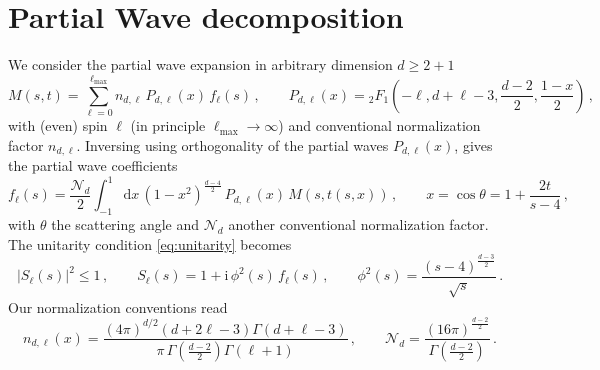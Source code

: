 \section*{Partial Wave decomposition}
We consider the partial wave expansion in arbitrary dimension $d\geq 2+1$
\begin{equation}
M(s,t)=\sum_{\ell=0}^{\ell_\mathrm{max}}n_{d,\ell}\,P_{d,\ell}(x)\,f_\ell(s)\,,
\qquad
P_{d,\ell}(x)={}_2F_1\left(-\ell,d+\ell-3,\frac{d-2}{2},\frac{1-x}{2}\right)\,,
\end{equation}
with (even) spin $\ell$ (in principle $\ell_\mathrm{max}\rightarrow\infty$) and conventional normalization factor $n_{d,\ell}$. Inversing using orthogonality of the partial waves $P_{d,\ell}(x)$, gives the partial wave coefficients
\begin{equation}
f_\ell(s)=\frac{\mathcal{N}_d}{2}\int_{-1}^{1}\mathrm{d}x\,(1-x^2)^{\frac{d-4}{2}}\,P_{d,\ell}(x)\,M(s,t(s,x))\,, 
\qquad
x=\cos\theta=1+\frac{2t}{s-4}\,,
\end{equation}
with $\theta$ the scattering angle and $\mathcal{N}_d$ another conventional normalization factor.
The unitarity condition \eqref{eq:unitarity} becomes
\begin{equation}
|S_\ell(s)|^2\leq 1\,,
\qquad
S_\ell(s)=1+\mathrm{i}\,\phi^2(s)\,f_\ell(s)\,, 
\qquad
\phi^2(s)=\frac{(s-4)^{\frac{d-3}{2}}}{\sqrt{s}}\,.
\label{eq:unitarity2}
\end{equation}
Our normalization conventions read
\begin{equation}
n_{d,\ell}(x)=\frac{(4\pi)^{d/2}(d+2\ell-3)\Gamma(d+\ell-3)}{\pi\,\Gamma\left(\frac{d-2}{2}\right)\Gamma(\ell+1)}\,,
\qquad
\mathcal{N}_d=\frac{(16\pi)^{\frac{d-2}{2}}}{\Gamma\left(\frac{d-2}{2}\right)}\,.
\end{equation}



